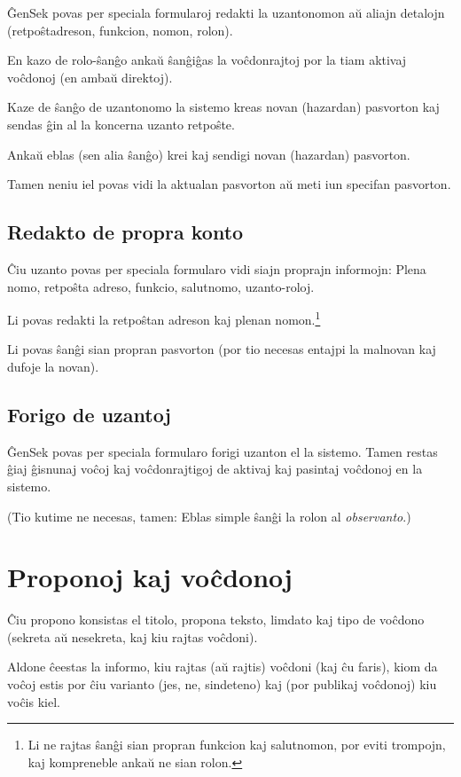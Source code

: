 \documentclass[draft]{scrartcl}
\begin{document}
ĜenSek povas per speciala formularoj redakti la uzantonomon aŭ aliajn
detalojn (retpoŝt\-adreson, funkcion, nomon, rolon).

En kazo de rolo-ŝanĝo ankaŭ  ŝanĝiĝas la voĉdonrajtoj por la tiam aktivaj
voĉdonoj (en ambaŭ direktoj).

Kaze de ŝanĝo de uzantonomo la sistemo kreas novan (hazardan) pasvorton
kaj sendas ĝin al la koncerna uzanto retpoŝte.

Ankaŭ eblas (sen alia ŝanĝo) krei kaj sendigi novan (hazardan) pasvorton.

Tamen neniu iel povas vidi la aktualan pasvorton aŭ meti iun specifan
pasvorton.

\subsection{Redakto de propra konto}

Ĉiu uzanto povas per speciala formularo vidi siajn
proprajn informojn: Plena nomo, retpoŝta adreso, funkcio, salutnomo,
uzanto-roloj.

Li povas redakti la retpoŝtan adreson kaj plenan nomon.\footnote{Li ne rajtas
  ŝanĝi sian propran funkcion kaj salutnomon, por eviti trompojn, kaj
  kompreneble ankaŭ ne sian rolon.}

Li povas ŝanĝi sian propran pasvorton (por tio necesas entajpi la malnovan
kaj dufoje la novan).


\subsection{Forigo de uzantoj}

ĜenSek povas per speciala formularo forigi uzanton el la sistemo.
Tamen restas ĝiaj ĝisnunaj voĉoj kaj voĉdonrajtigoj de aktivaj
kaj pasintaj voĉdonoj en la sistemo.

(Tio kutime ne necesas, tamen: Eblas simple ŝanĝi la rolon
 al \emph{observanto}.)


\section{Proponoj kaj voĉdonoj}

Ĉiu propono konsistas el titolo, propona teksto, limdato kaj tipo
de voĉdono (sekreta aŭ nesekreta, kaj kiu rajtas voĉdoni).

Aldone ĉeestas la informo, kiu rajtas (aŭ rajtis) voĉdoni (kaj ĉu faris),
kiom da voĉoj estis por ĉiu varianto (jes, ne, sindeteno) kaj (por publikaj
voĉdonoj) kiu voĉis kiel.
\end{document}
